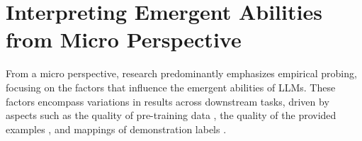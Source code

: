 \section{Interpreting Emergent Abilities from Micro Perspective}
From a micro perspective, research predominantly emphasizes empirical probing, focusing on the factors that influence the emergent abilities of LLMs.
 These factors encompass variations in results across downstream tasks, driven by aspects such as the quality of pre-training data \citep{Chan2022DataDP, Razeghi2022ImpactOP, Shin2022OnTE, Razeghi2022ImpactOP, Power2022GrokkingGB}, the quality of the provided examples \citep{Lu2021FantasticallyOP, Liu2021WhatMG, Wang2022TowardsUC, Turpin2023LanguageMD}, and mappings of demonstration labels \citep{Min2022RethinkingTR,Kossen2023InContextLI,Wei2023LargerLM,Kim2022GroundTruthLM}.

